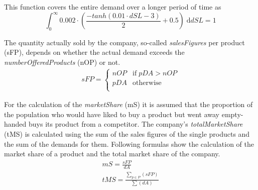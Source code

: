 This function covers the entire demand over a longer period of time as
\begin{equation}
	\int_{0}^{\infty} 0.002 \cdot (\frac{-tanh(0.01 \cdot dSL-3)}{2} + 0.5)\; \mathrm{d} dSL = 1  
\end{equation}

The quantity actually sold by the company, so-called \textit{salesFigures} per product (\gls{sFP}), depends on whether the actual demand exceeds the \textit{numberOfferedProducts} (\gls{nOP}) or not.
\begin{equation}
\label{func:salesFigure}
\begin{aligned}
sFP = 
\begin{cases}
     nOP & \text{if} \; pDA > nOP\\
     pDA & \text{otherwise} \\
\end{cases}
\end{aligned}
\end{equation}

For the calculation of the \textit{marketShare} (\gls{mS}) it is assumed that the proportion of the population who would have liked to buy a product but went away empty-handed buys its product from a competitor. The company's \textit{totalMarketShare} (\gls{tMS}) is calculated using the sum of the sales figures of the single products and the sum of the demands for them. Following formulas show the calculation of the market share of a product and the total market share of the company. 
\begin{equation}
\label{func:marketShare}
\begin{aligned}
mS = \frac{sFP}{dA} \\
tMS = \frac{\sum_{p \in P}(sFP)}{\sum(dA)}  
\end{aligned}
\end{equation}

